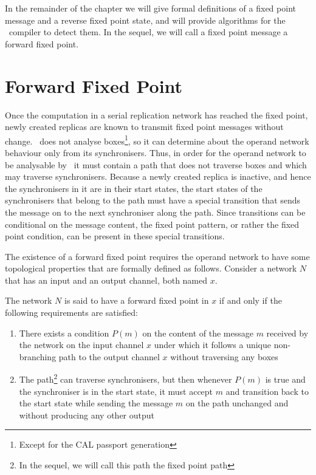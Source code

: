 In the remainder of the chapter we will give formal definitions of a fixed point message and a reverse fixed point state, and will provide algorithms for the \ak\ compiler to detect them. In the sequel, we will call a fixed point message a forward fixed point.


    \section{Forward Fixed Point}
Once the computation in a serial replication network has reached the fixed point, newly created replicas are known to transmit fixed point messages without change. \ak\ does not analyse boxes\footnote{Except for the CAL passport generation}, so it can determine about the operand network behaviour only from its synchronisers. Thus, in order for the operand network to be analysable by \ak\, it must contain a path that does not traverse boxes and which may traverse synchronisers. Because a newly created replica is inactive, and hence the synchronisers in it are in their start states, the start states of the synchronisers that belong to the path must have a special transition that sends the message on to the next synchroniser along the path. Since transitions can be conditional on the message content, the fixed point pattern, or rather the fixed point condition, can be present in these special transitions.

The existence of a forward fixed point requires the operand network to have some topological properties that are formally defined as follows. Consider a network $N$ that has an input and an output channel, both named $x$.

\begin{definition}\label{ffp_def}The network $N$ is said to have a forward fixed point in $x$ if and only if the following requirements are satisfied:
\begin{enumerate}
\item There exists a condition $P(m)$ on the content of the message $m$ received by the network on the input channel $x$ under which it follows a unique non-branching path to the output channel $x$ without traversing any boxes
\item The path\footnote{In the sequel, we will call this path the fixed point path} can traverse synchronisers, but then whenever $P(m)$ is true and the synchroniser is in the start state, it must accept $m$ and transition back to the start state while sending the message $m$ on the path unchanged and without producing any other output
\end{enumerate}
\end{definition}

